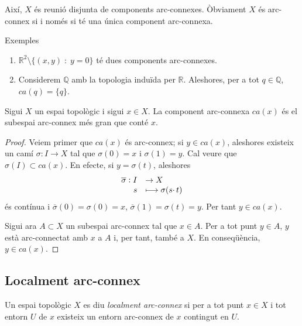 \documentclass[../main.tex]{subfiles}
\begin{document}
Així, $X$ és reunió disjunta de components arc-connexes. Òbviament $X$ és arc-connex si i només si té una única component arc-connexa.

\begin{ej}
\label{ej:componentsarcconnexes} Exemples
\begin{enumerate}
    \item $\mathbb{R}^2\setminus\{(x,y)\;:\;y=0\}$ té dues components arc-connexes.
    \item Considerem $\mathbb{Q}$ amb la topologia induïda per $\mathbb{R}$. Aleshores, per a tot $q\in\mathbb{Q}$, $ca(q) = \{q\}$.
\end{enumerate}
\end{ej}

\begin{prop}
\label{prop:subespaiarcconnexmesgranquecontex} Sigui $X$ un espai topològic i sigui $x\in X$. La component arc-connexa $ca(x)$ és el subespai arc-connex més gran que conté $x$.
\end{prop}
\begin{proof}
Veiem primer que $ca(x)$ és arc-connex; si $y\in ca(x)$, aleshores existeix un camí $\sigma:I\rightarrow X  $ tal que $\sigma(0) = x$ i $\sigma(1) = y$. Cal veure que $\sigma(I)\subset ca(x)$. En efecte, si $y=\sigma(t)$, aleshores
\begin{equation}
    \notag
    \begin{array}{rl}
        \overline{\sigma}:I & \rightarrow X \\
        s & \longmapsto \sigma(s\cdotp t)
    \end{array}
\end{equation}
és contínua i $\overline{\sigma}(0)=\sigma(0)=x$, $\overline{\sigma}(1)=\sigma(t)=y$. Per tant $y\in ca(x)$. 

Sigui ara $A\subset X$ un subespai arc-connex tal que $x\in A$. Per a tot punt $y\in A$, $y$ està arc-connectat amb $x$ a $A$ i, per tant, també a $X$. En conseqüència, $y\in ca(x)$.
\end{proof}

\subsection{Localment arc-connex}

\begin{defi}
\label{def:localmentarcconnex} Un espai topològic $X$ es diu \textit{localment arc-connex} si per a tot punt $x\in X$ i tot entorn $U$ de $x$ existeix un entorn arc-connex de $x$ contingut en $U$.
\end{defi}
\end{document}
